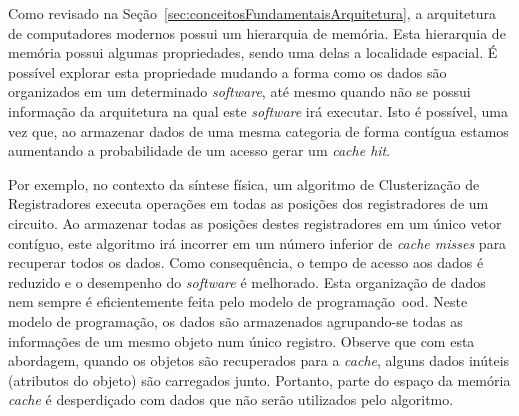 
Como revisado na Seção~\ref{sec:conceitosFundamentaisArquitetura}, a arquitetura de computadores modernos possui um hierarquia de memória.
Esta hierarquia de memória possui algumas propriedades, sendo uma delas a localidade espacial.
É possível explorar esta propriedade mudando a forma como os dados são organizados em um determinado \textit{software}, até mesmo quando não se possui informação da arquitetura na qual este \textit{software} irá executar.
Isto é possível, uma vez que, ao armazenar dados de uma mesma categoria de forma contígua estamos aumentando a probabilidade de um acesso gerar um \textit{cache hit}.

Por exemplo, no contexto da síntese física, um algoritmo de Clusterização de Registradores executa operações em todas as posições dos registradores de um circuito.
Ao armazenar todas as posições destes registradores em um único vetor contíguo, este algoritmo irá incorrer em um número inferior de \textit{cache misses} para recuperar todos os dados.
Como consequência, o tempo de acesso aos dados é reduzido e o desempenho do \textit{software} é melhorado. Esta organização de dados nem sempre é eficientemente feita pelo modelo de programação~\ac{ood}.
Neste modelo de programação, os dados são armazenados agrupando-se todas as informações de um mesmo objeto num único registro.
Observe que com esta abordagem, quando os objetos são recuperados para a \textit{cache}, alguns dados inúteis (atributos do objeto) são carregados junto.
Portanto, parte do espaço da memória \textit{cache} é desperdiçado com dados que não serão utilizados pelo algoritmo.

